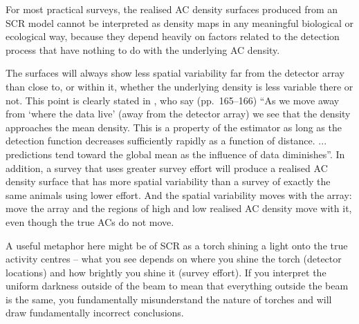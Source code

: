 \documentclass[useAMS,usenatbib,referee]{biom}
\begin{document}

For most practical surveys, the realised AC density surfaces produced from an SCR model cannot be interpreted as density maps in any meaningful biological or ecological way, because they depend heavily on factors related to the detection process that have nothing to do with the underlying AC density. 

The surfaces will always show less spatial variability far from the detector array than close to, or within it, whether the underlying density is less variable there or not. This point is clearly stated in \cite{Royle+al:13a}, who say (pp.\ 165--166) ``As we move away from `where the data live' (away from the detector array) we see that the density approaches the mean density. This is a property of the estimator as long as the detection function decreases sufficiently rapidly as a function of distance. ... predictions tend toward the global mean as the influence of data diminishes''. In addition, a survey that uses greater survey effort will produce a realised AC density surface that has more spatial variability than a survey of exactly the same animals using lower effort. And the spatial variability moves with the array: move the array and the regions of high and low realised AC density move with it, even though the true ACs do not move.

A useful metaphor here might be of SCR as a torch shining a light onto the true activity centres -- what you see depends on where you shine the torch (detector locations) and how brightly you shine it (survey effort). If you interpret the uniform darkness outside of the beam to mean that everything outside the beam is the same, you fundamentally misunderstand the nature of torches and will draw fundamentally incorrect conclusions.

\end{document}
